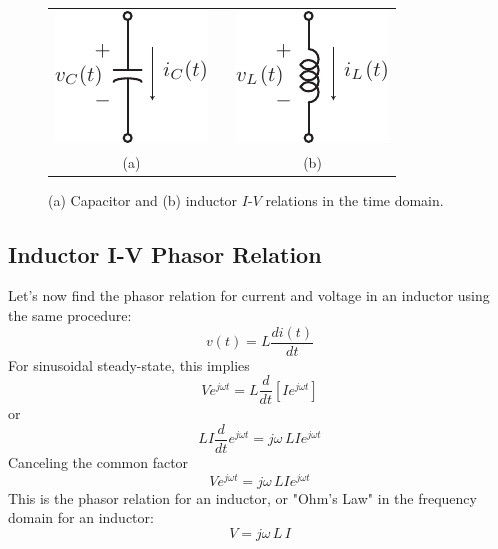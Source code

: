 \begin{figure}[tb]
\begin{center}
\begin{tabular}{ccc}
\includegraphics[width=.25\columnwidth]{mod1_3_3_cap} & \hspace{1cm} &
\includegraphics[width=.25\columnwidth]{mod1_3_4_ind} \\
(a) & & (b) \\
\end{tabular}
\end{center}
\caption{(a) Capacitor and (b) inductor  $I$-$V$ relations in the time domain. } \label{fig:lcphasor}
\end{figure}



\subsection{Inductor I-V Phasor Relation}

Let's now find the phasor relation for current and voltage in an inductor using the same procedure:
\begin{equation}
v(t) = L\frac{{di(t)}}{{dt}}
\end{equation} 
For sinusoidal steady-state, this implies
\begin{equation}
V{e^{j\omega t}} = L\frac{d}{{dt}}[I{e^{j\omega t}}]
\end{equation}
or
\begin{equation}
LI\frac{d}{{dt}}{e^{j\omega t}} = j\omega \,LI{e^{j\omega t}}
\end{equation}
Canceling the common factor
\begin{equation}
V{e^{j\omega t}} = j\omega \,LI{e^{j\omega t}}
\end{equation}
This is the phasor relation for an inductor, or "Ohm's Law" in the frequency domain for an inductor:
\begin{equation}
V = j\omega \,L\,I
\end{equation}




